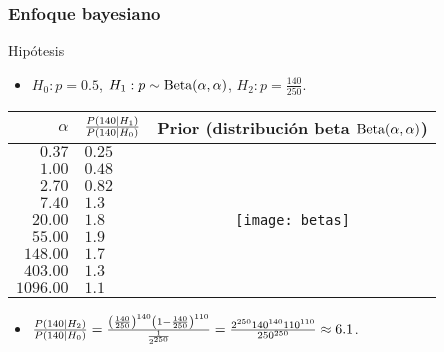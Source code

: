 \documentclass[table]{beamer}
\begin{document}
\begin{frame}
    \frametitle{Enfoque bayesiano}
    \begin{block}{Hipótesis}
        \begin{itemize}
            \item $H_{0}: p = 0.5$, $H_{1}: p \sim \betadist{\alpha}{\alpha}$, $H_{2}: p = \frac{140}{250}$.
        \end{itemize}
    \end{block}
    \begin{center}
        \begin{tabular}{r|lc}
            $\alpha$ & $\frac{\prob{140 \mid H_{1}}}{\prob{140 \mid H_{0}}}$ & Prior (distribución beta $\betadist{\alpha}{\alpha}$) \\
            \hline
            $0.37$ & $0.25$ & \multirow{9}{*}{\texttt{[image: betas]}} \\
            $1.00$ & $\mathbf{0.48}$ \\
            $2.70$ & $0.82$ \\
            $7.40$ & $1.3$ \\
            $20.00$ & $1.8$ \\
            $55.00$ & $\mathbf{1.9}$ \\
            $148.00$ & $1.7$ \\
            $403.00$ & $1.3$ \\
            $1096.00$ & $1.1$
        \end{tabular}
    \end{center}
    \begin{block}{}%
        \begin{itemize}
            \item $\frac{\prob{140 \mid H_{2}}}{\prob{140 \mid H_{0}}} = \frac{\parens{\frac{140}{250}}^{140} \parens{1 - \frac{140}{250}}^{110}}{\frac{1}{2^{250}}}
                = \frac{2^{250} 140^{140} 110^{110}}{250^{250}} \approx 6.1$.
        \end{itemize}
    \end{block}
\end{frame}
\end{document}
